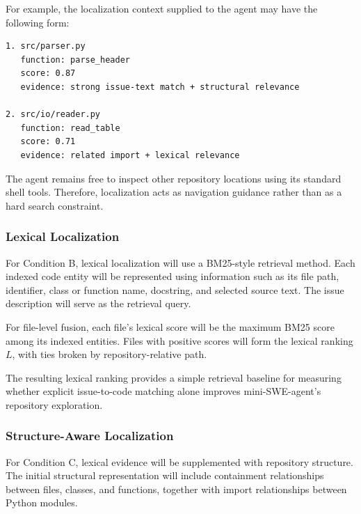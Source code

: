 \documentclass[11pt]{article}
\begin{document}
For example, the localization context supplied to the agent may have the
following form:

\begin{verbatim}
1. src/parser.py
   function: parse_header
   score: 0.87
   evidence: strong issue-text match + structural relevance

2. src/io/reader.py
   function: read_table
   score: 0.71
   evidence: related import + lexical relevance
\end{verbatim}

The agent remains free to inspect other repository locations using its
standard shell tools. Therefore, localization acts as navigation guidance
rather than as a hard search constraint.


\subsubsection*{Lexical Localization}

For Condition B, lexical localization will use a BM25-style retrieval
method. Each indexed code entity will be represented using information
such as its file path, identifier, class or function name, docstring, and
selected source text. The issue description will serve as the retrieval
query. 

For file-level fusion, each file's lexical score will be the maximum
BM25 score among its indexed entities. Files with positive scores will
form the lexical ranking $L$, with ties broken by repository-relative path.

The resulting lexical ranking provides a simple retrieval baseline for
measuring whether explicit issue-to-code matching alone improves
mini-SWE-agent's repository exploration.


\subsubsection*{Structure-Aware Localization}

For Condition C, lexical evidence will be supplemented with repository
structure. The initial structural representation will include containment
relationships between files, classes, and functions, together with import
relationships between Python modules.
\end{document}
